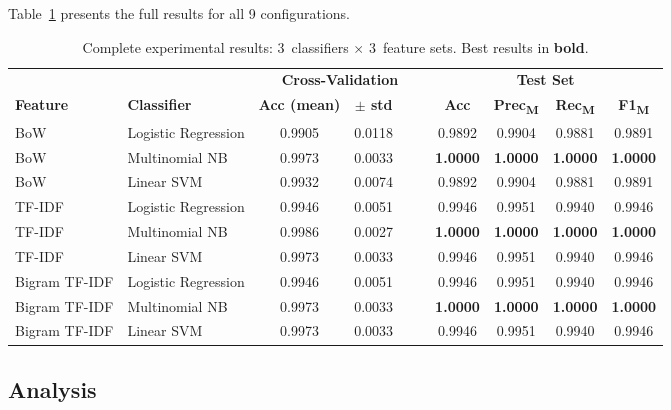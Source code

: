 \documentclass[conference, 10pt]{IEEEtran}
\begin{document}
Table~\ref{tab:results} presents the full results for all 9 configurations.

\begin{table}[t]
\centering
\caption{Complete experimental results: 3~classifiers $\times$ 3~feature sets.  Best results in \textbf{bold}.}
\label{tab:results}
\begin{tabular}{ll cccc cccc}
\toprule
& & \multicolumn{4}{c}{\textbf{Cross-Validation}} & \multicolumn{4}{c}{\textbf{Test Set}} \\
\cmidrule(lr){3-6} \cmidrule(lr){7-10}
\textbf{Feature} & \textbf{Classifier} & \textbf{Acc (mean)} & \textbf{$\pm$ std} & & & \textbf{Acc} & \textbf{Prec\textsubscript{M}} & \textbf{Rec\textsubscript{M}} & \textbf{F1\textsubscript{M}} \\
\midrule
BoW            & Logistic Regression & 0.9905 & 0.0118 & & & 0.9892 & 0.9904 & 0.9881 & 0.9891 \\
BoW            & Multinomial NB      & 0.9973 & 0.0033 & & & \textbf{1.0000} & \textbf{1.0000} & \textbf{1.0000} & \textbf{1.0000} \\
BoW            & Linear SVM          & 0.9932 & 0.0074 & & & 0.9892 & 0.9904 & 0.9881 & 0.9891 \\
\midrule
TF-IDF         & Logistic Regression & 0.9946 & 0.0051 & & & 0.9946 & 0.9951 & 0.9940 & 0.9946 \\
TF-IDF         & Multinomial NB      & 0.9986 & 0.0027 & & & \textbf{1.0000} & \textbf{1.0000} & \textbf{1.0000} & \textbf{1.0000} \\
TF-IDF         & Linear SVM          & 0.9973 & 0.0033 & & & 0.9946 & 0.9951 & 0.9940 & 0.9946 \\
\midrule
Bigram TF-IDF  & Logistic Regression & 0.9946 & 0.0051 & & & 0.9946 & 0.9951 & 0.9940 & 0.9946 \\
Bigram TF-IDF  & Multinomial NB      & 0.9973 & 0.0033 & & & \textbf{1.0000} & \textbf{1.0000} & \textbf{1.0000} & \textbf{1.0000} \\
Bigram TF-IDF  & Linear SVM          & 0.9973 & 0.0033 & & & 0.9946 & 0.9951 & 0.9940 & 0.9946 \\
\bottomrule
\end{tabular}
\end{table}

\subsection{Analysis}
\end{document}
